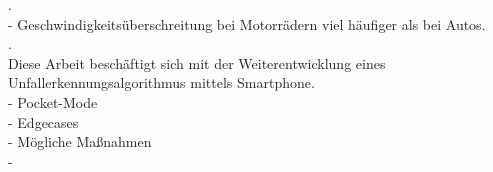 .\\

-	Geschwindigkeitsüberschreitung bei Motorrädern viel häufiger als bei Autos.\\

.\\

Diese Arbeit beschäftigt sich mit der Weiterentwicklung eines Unfallerkennungsalgorithmus mittels Smartphone. \\
- Pocket-Mode\\
- Edgecases\\
- Mögliche Maßnahmen\\
- 











